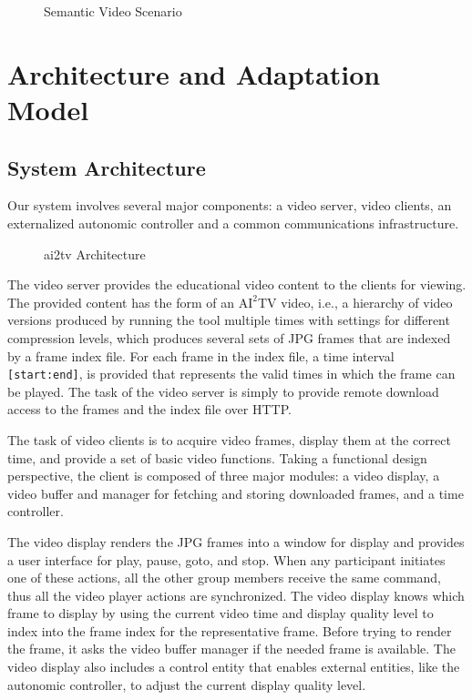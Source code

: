 \documentclass{sig-alternate}
\begin{document}
\begin{figure}
  \centering
  \caption{Semantic Video Scenario}
  \label{vidframes}
\end{figure} 


\section{Architecture and Adaptation\\ Model}
\subsection{System Architecture}
Our system involves several major components: a video server, video
clients, an externalized autonomic controller and a common
communications infrastructure.

\begin{figure}
  \centering
  \caption{ai2tv Architecture}
  \label{ai2tv_arch}
\end{figure}

The video server provides the educational video content to the clients
for viewing.  The provided content has the form of an
$\mathrm{AI}^2$TV video, i.e., a hierarchy of video versions produced
by running the tool multiple times with settings for different
compression levels, which produces several sets of JPG frames that are
indexed by a frame index file.  For each frame in the index file, a
time interval \texttt{[start:end]}, is provided that represents the
valid times in which the frame can be played.  The task of the video
server is simply to provide remote download access to the frames and
the index file over HTTP.

The task of video clients is to acquire video frames, display them at
the correct time, and provide a set of basic video functions.  Taking
a functional design perspective, the client is composed of three major
modules: a video display, a video buffer and manager for fetching and
storing downloaded frames, and a time controller.

The video display renders the JPG frames into a window for display and
provides a user interface for play, pause, goto, and stop.  When any
participant initiates one of these actions, all the other group
members receive the same command, thus all the video player actions
are synchronized.  The video display knows which frame to display by
using the current video time and display quality level to index into
the frame index for the representative frame.  Before trying to render
the frame, it asks the video buffer manager if the needed frame is
available.  The video display also includes a control entity that
enables external entities, like the autonomic controller, to adjust
the current display quality level.
\end{document}
